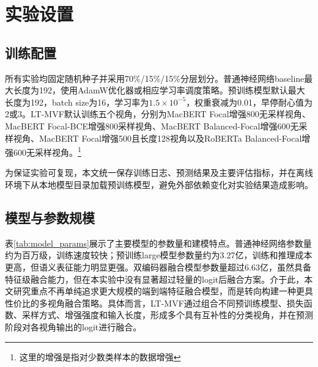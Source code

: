 \documentclass[UTF8, fontset=windows]{ctexart}
\begin{document}
	\section{实验设置}
	
	\subsection{训练配置}
	
	所有实验均固定随机种子并采用70\%/15\%/15\%分层划分。普通神经网络baseline最大长度为192，使用AdamW优化器或相应学习率调度策略。预训练模型默认最大长度为192，batch size为16，学习率为$1.5\times10^{-5}$，权重衰减为0.01，早停耐心值为2或3。LT-MVF默认训练五个视角，分别为MacBERT Focal增强800无采样视角、MacBERT Focal-BCE增强800采样视角、MacBERT Balanced-Focal增强600无采样视角、MacBERT Focal增强500且长度128视角以及RoBERTa Balanced-Focal增强600无采样视角。\footnote{这里的增强是指对少数类样本的数据增强}
	
	为保证实验可复现，本文统一保存训练日志、预测结果及主要评估指标，并在离线环境下从本地模型目录加载预训练模型，避免外部依赖变化对实验结果造成影响。
	
	\subsection{模型与参数规模}
	
	表\ref{tab:model_params}展示了主要模型的参数量和建模特点。普通神经网络参数量约为百万级，训练速度较快；预训练large模型参数量约为3.27亿，训练和推理成本更高，但语义表征能力明显更强。双编码器融合模型参数量超过6.63亿，虽然具备特征级融合能力，但在本实验中没有显著超过轻量的logit后融合方案。介于此，本文研究重点不再单纯追求更大规模的端到端特征融合模型，而是转向构建一种更具性价比的多视角融合策略。具体而言，LT-MVF通过组合不同预训练模型、损失函数、采样方式、增强强度和输入长度，形成多个具有互补性的分类视角，并在预测阶段对各视角输出的logit进行融合。
	
	\begin{table}[htbp]
		\centering
		\caption{主要模型参数规模与特点}
		\label{tab:model_params}
	\end{table}
	
\end{document}
